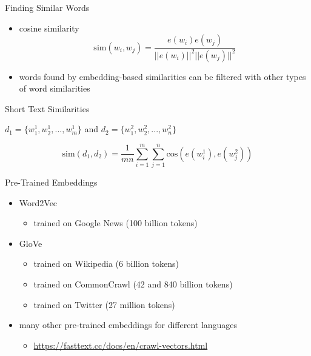\documentclass[12pt, handout]{beamer}
\begin{document}
\begin{frame}{Finding Similar Words}
	\begin{itemize}
		\item<4-> cosine similarity
		\begin{equation*}
		\text{sim}(w_i,w_j) = \frac{e(w_i) e(w_j)}{||e(w_i)||^2 ||e(w_j)||^2}
		\end{equation*} 
		\item words found by embedding-based similarities can be filtered with other types of word similarities 
	\end{itemize}
\end{frame}
\begin{frame}{Short Text Similarities}
	
$d_1 = \{ w^1_1, w^1_2, ..., w^1_m \}$ and $d_2 = \{ w^2_1, w^2_2, ..., w^2_n \}$

\begin{equation*}
\text{sim}(d_1, d_2) = \frac{1}{m n}\sum_{i = 1}^m \sum_{j=1}^{n} \text{cos} \left( e(w_i^1), e(w_j^2) \right)
\end{equation*}
		

\end{frame} 


 \begin{frame}{Pre-Trained Embeddings}
	\begin{itemize}
		\item Word2Vec
		\begin{itemize}
			\item trained on Google News (100 billion tokens)
		\end{itemize}
		\item GloVe
		\begin{itemize}
			\item trained on Wikipedia (6 billion tokens)
			\item trained on CommonCrawl (42 and 840 billion tokens)
			\item trained on Twitter (27 million tokens)
		\end{itemize}
		\item many other pre-trained embeddings for different languages 
		\begin{itemize}
			\item \url{https://fasttext.cc/docs/en/crawl-vectors.html}
		\end{itemize}
	\end{itemize}
\end{frame}
\end{document}
